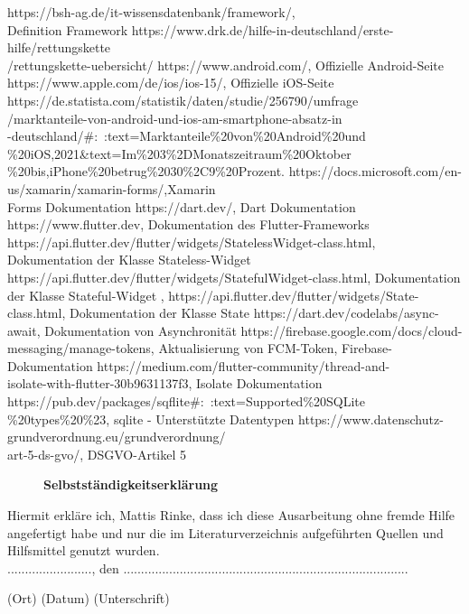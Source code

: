 \documentclass[12pt]{article}
\begin{document}
\begin{thebibliography}{9}
    https://bsh-ag.de/it-wissensdatenbank/framework/,\\ Definition Framework
    https://www.drk.de/hilfe-in-deutschland/erste-hilfe/rettungskette\\
    /rettungskette-uebersicht/
    https://www.android.com/, Offizielle Android-Seite
    https://www.apple.com/de/ios/ios-15/, Offizielle iOS-Seite
    https://de.statista.com/statistik/daten/studie/256790/umfrage\\
    /marktanteile-von-android-und-ios-am-smartphone-absatz-in\\
    -deutschland/\#:~:text=Marktanteile\%20von\%20Android\%20und\\
    \%20iOS,2021\&text=Im\%203\%2DMonatszeitraum\%20Oktober\\
    \%20bis,iPhone\%20betrug\%2030\%2C9\%20Prozent.
    https://docs.microsoft.com/en-us/xamarin/xamarin-forms/,Xamarin \\
    Forms Dokumentation
    https://dart.dev/, Dart Dokumentation
    https://www.flutter.dev, Dokumentation des Flutter-Frameworks
    https://api.flutter.dev/flutter/widgets/StatelessWidget-class.html,
    \\ Dokumentation der Klasse Stateless-Widget
    https://api.flutter.dev/flutter/widgets/StatefulWidget-class.html, 
    Dokumentation der Klasse Stateful-Widget
    , https://api.flutter.dev/flutter/widgets/State-class.html, Dokumentation der 
    Klasse State
    https://dart.dev/codelabs/async-await, Dokumentation von Asynchronität
    https://firebase.google.com/docs/cloud-messaging/manage-tokens, 
    Aktualisierung von FCM-Token, Firebase-Dokumentation
    https://medium.com/flutter-community/thread-and-\\isolate-with-flutter-30b9631137f3, Isolate Dokumentation
    https://pub.dev/packages/sqflite\#:~:text=Supported\%20SQLite\\
    \%20types\%20\%23, sqlite - Unterstützte Datentypen
    https://www.datenschutz-grundverordnung.eu/grundverordnung/\\
    art-5-ds-gvo/, DSGVO-Artikel 5
\end{thebibliography}

\newpage
\begin{figure}
    \textbf{\Large{Selbstständigkeitserklärung}}
\end{figure}

\noindent Hiermit erkläre ich, Mattis Rinke, dass ich diese Ausarbeitung ohne fremde Hilfe
angefertigt habe und nur die im Literaturverzeichnis aufgeführten
Quellen und Hilfsmittel genutzt wurden.\\

    ........................, den .................................................................................

\quad\quad  (Ort)    \hfil           (Datum)                   \hfil  (Unterschrift)
\end{document}
